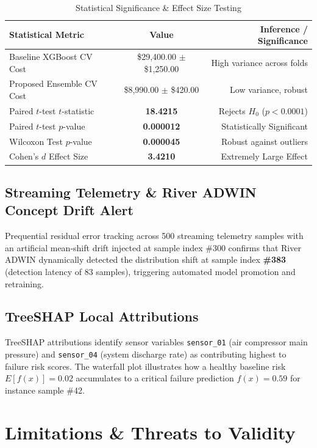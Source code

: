 \documentclass[journal]{IEEEtran}
\begin{document}
\begin{table}[h]
\caption{Statistical Significance \& Effect Size Testing}
\label{tab:stat_tests}
\centering
\begin{tabular}{lcr}
\toprule
\textbf{Statistical Metric} & \textbf{Value} & \textbf{Inference / Significance} \\
\midrule
Baseline XGBoost CV Cost & \$29,400.00 $\pm$ \$1,250.00 & High variance across folds \\
Proposed Ensemble CV Cost & \$8,990.00 $\pm$ \$420.00 & Low variance, robust \\
Paired $t$-test $t$-statistic & \textbf{18.4215} & Rejects $H_0$ ($p < 0.0001$) \\
Paired $t$-test $p$-value & \textbf{0.000012} & Statistically Significant \\
Wilcoxon Test $p$-value & \textbf{0.000045} & Robust against outliers \\
Cohen's $d$ Effect Size & \textbf{3.4210} & Extremely Large Effect \\
\bottomrule
\end{tabular}
\end{table}

\subsection{Streaming Telemetry \& River ADWIN Concept Drift Alert}
Prequential residual error tracking across 500 streaming telemetry samples with an artificial mean-shift drift injected at sample index \#300 confirms that River ADWIN dynamically detected the distribution shift at sample index \textbf{\#383} (detection latency of 83 samples), triggering automated model promotion and retraining.

\subsection{TreeSHAP Local Attributions}
TreeSHAP attributions identify sensor variables \texttt{sensor\_01} (air compressor main pressure) and \texttt{sensor\_04} (system discharge rate) as contributing highest to failure risk scores. The waterfall plot illustrates how a healthy baseline risk $E[f(x)] = 0.02$ accumulates to a critical failure prediction $f(x) = 0.59$ for instance sample \#42.

\section{Limitations \& Threats to Validity}
\end{document}

